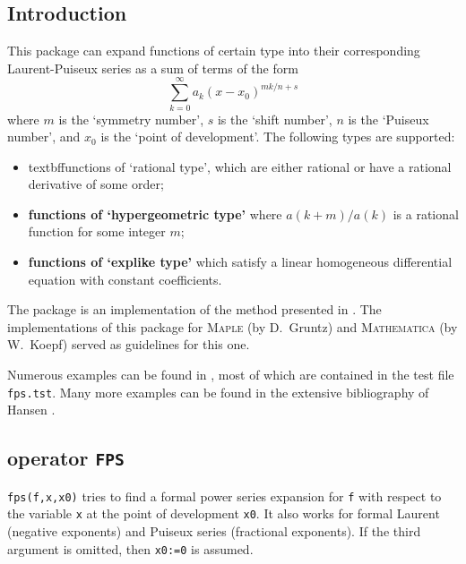 
\subsection{Introduction}
This package can expand functions of certain type into
their corresponding Laurent-Puiseux series as a sum of terms of the form
\[
\sum_{k=0}^{\infty} a_{k} (x-x_{0})^{m k/n + s}
\]
where $m$ is the `symmetry number', $s$ is the `shift number',
$n$ is the `Puiseux number',
and $x_0$ is the `point of development'. The following types are
supported:
\begin{itemize}
\item
textbf{functions of `rational type'}, which are either rational or have a
rational derivative of some order;
\item
\textbf{functions of `hypergeometric type'} where $a(k+m)/a(k)$ is a rational
function for some integer $m$;
\item
\textbf{functions of `explike type'} which satisfy a linear homogeneous
differential equation with constant coefficients.
\end{itemize}

The  package is an implementation of the method
presented in \cite{Koepf:92}. The implementations of this package
for \textsc{Maple} (by D.\ Gruntz) and \textsc{Mathematica} (by W.\ Koepf)
served as guidelines for this one.

Numerous examples can be found in \cite{Koepf:93a,Koepf:93b}, 
most of which are contained in the test file \texttt{fps.tst}. Many 
more examples can be found in the extensive bibliography of Hansen \cite{Hansen:75}.


\subsection{\REDUCE{} operator \texttt{FPS}}

\hypertarget{operator:FPS}{}
\texttt{fps(f,x,x0)} tries to find a formal power
series expansion for \texttt{f} with respect to the variable \texttt{x} 
at the point of development \texttt{x0}. 
It also works for formal Laurent (negative exponents) and Puiseux series
(fractional exponents). If the third 
argument is omitted, then \texttt{x0:=0} is assumed.

